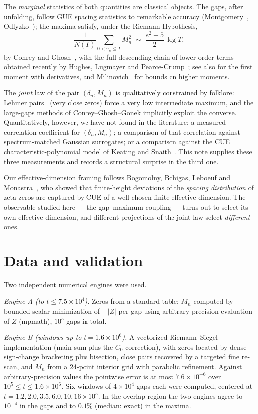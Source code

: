 \documentclass[12pt]{amsart}
\begin{document}
The \emph{marginal} statistics of both quantities are classical objects.
The gaps, after unfolding, follow GUE spacing statistics to remarkable
accuracy (Montgomery~\cite{Mont73}, Odlyzko~\cite{Odl87}); the maxima
satisfy, under the Riemann Hypothesis,
\begin{equation}\label{eq:CG}
\frac{1}{N(T)} \sum_{0 < \gamma_n \le T} M_n^2 \;\sim\; \frac{e^2-5}{2}\,
\log T ,
\end{equation}
by Conrey and Ghosh~\cite{CG85}, with the full descending chain of
lower-order terms obtained recently by Hughes, Lugmayer and
Pearce-Crump~\cite{HLPC24}; see also \cite{PC24} for the first moment with
derivatives, and Milinovich~\cite{Mil11} for bounds on higher moments.

The \emph{joint} law of the pair $(\delta_n, M_n)$ is qualitatively
constrained by folklore: Lehmer pairs~\cite{Leh56} (very close zeros) force
a very low intermediate maximum, and the large-gaps methods of
Conrey--Ghosh--Gonek implicitly exploit the converse. Quantitatively,
however, we have not found in the literature: a measured correlation
coefficient for $(\delta_n, M_n)$; a comparison of that correlation against
spectrum-matched Gaussian surrogates; or a comparison against the CUE
characteristic-polynomial model of Keating and Snaith~\cite{KS00}. This
note supplies these three measurements and records a structural surprise in
the third one.

Our effective-dimension framing follows Bogomolny, Bohigas, Leboeuf and
Monastra~\cite{BBLM06}, who showed that finite-height deviations of the
\emph{spacing distribution} of zeta zeros are captured by CUE of a
well-chosen finite effective dimension. The observable studied here --- the
gap--maximum coupling --- turns out to select its own effective dimension,
and different projections of the joint law select \emph{different} ones.

\section{Data and validation}\label{sec:data}

Two independent numerical engines were used.

\emph{Engine A (to $t \le 7.5\times 10^4$).} Zeros from a standard table;
$M_n$ computed by bounded scalar minimization of $-|Z|$ per gap using
arbitrary-precision evaluation of $Z$ (mpmath), $10^5$ gaps in total.

\emph{Engine B (windows up to $t = 1.6\times 10^6$).} A vectorized
Riemann--Siegel implementation (main sum plus the $C_0$ correction), with
zeros located by dense sign-change bracketing plus bisection, close pairs
recovered by a targeted fine re-scan, and $M_n$ from a 24-point interior
grid with parabolic refinement. Against arbitrary-precision values the
pointwise error is at most $7.6\times10^{-6}$ over
$10^5 \le t \le 1.6\times 10^6$. Six windows of $4\times 10^4$ gaps each
were computed, centered at $t = 1.2, 2.0, 3.5, 6.0, 10, 16 \times 10^5$.
In the overlap region the two engines agree to $10^{-4}$ in the gaps and to
$0.1\%$ (median: exact) in the maxima.
\end{document}
